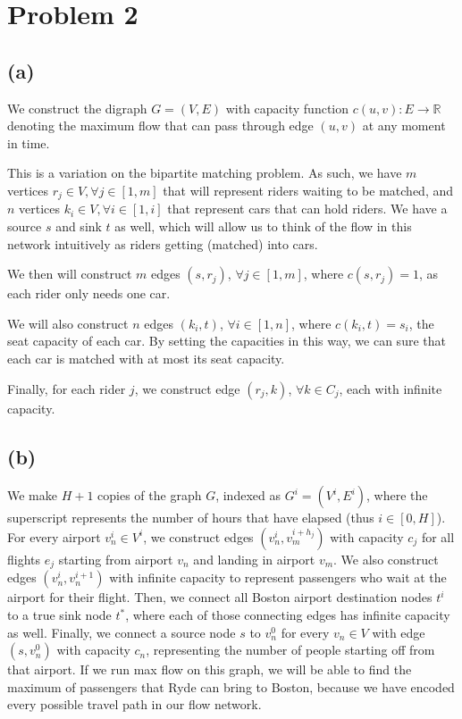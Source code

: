 \documentclass{6046}
\begin{document}
\section*{Problem 2}
\subsection*{(a)}
We construct the digraph $G = (V, E)$ with capacity function
$c(u, v): E \rightarrow \mathbb{R}$ denoting the
maximum flow that can pass through edge $(u, v)$ at
any moment in time.

This is a variation on the bipartite matching problem.
As such, we have $m$ vertices $r_j \in V, \forall
j \in [1, m]$ that will represent riders waiting to be
matched, and $n$ vertices $k_i \in V, \forall i \in
[1, i]$ that represent cars that
can hold riders. We have a source $s$ and
sink $t$ as well, which will allow us to think
of the flow in this network intuitively as riders
getting (matched) into cars.

We then will construct $m$ edges $(s, r_j)$, $\forall j \in [1, m]$,
where $c(s, r_j) = 1$, as each rider only needs one car.

We will also construct $n$ edges $(k_i, t)$, $\forall i \in [1, n]$,
where $c(k_i, t) = s_i$, the seat capacity of each car. By setting
the capacities in this way, we can sure that each car is matched with
at most its seat capacity.

Finally, for each rider $j$, we construct edge $(r_j, k)$, $\forall k \in C_j$,
each with infinite capacity. 

\subsection*{(b)}
We make $H + 1$ copies of the graph $G$, indexed as $G^i = (V^i, E^i)$,
where the superscript represents the number of hours
that have elapsed (thus $i \in [0, H]$). For every airport $v^i_n \in V^i$, we
construct edges $(v^i_n, v^{i + h_j}_m)$ with capacity $c_j$ for all flights $e_j$
starting from airport $v_n$ and landing in airport $v_m$.
We also construct edges $(v^i_n, v^{i + 1}_n)$ with infinite capacity to represent
passengers who wait at the airport for their flight. Then, we connect
all Boston airport destination nodes $t^i$ to a true sink node $t^*$, where each
of those connecting edges has infinite capacity as well. Finally, we connect
a source node $s$ to $v^0_n$ for every $v_n \in V$ with edge $(s, v^0_n)$ with
capacity $c_n$, representing the number of people starting off from that airport.
If we run max flow on this graph, we will be able to find the maximum of
passengers that Ryde can bring to Boston, because we have encoded every possible
travel path in our flow network.
\end{document}

